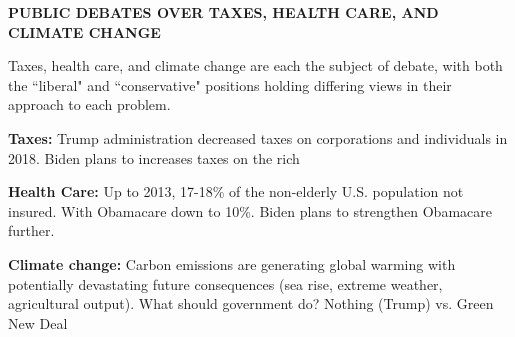 \documentclass[landscape]{slides}
\begin{document}
\begin{slide}
\begin{center}
{\bf PUBLIC DEBATES OVER TAXES, HEALTH CARE, AND CLIMATE CHANGE}
\end{center}

Taxes, health care, and climate change are each the subject of debate, with both the ``liberal" and ``conservative" positions holding differing views in their approach to each problem.

{\bf Taxes:} Trump administration decreased taxes on corporations and individuals in 2018. 
Biden plans to increases taxes on the rich

%

{\bf Health Care:}
Up to 2013, 17-18\% of the non-elderly U.S. population not insured.
With Obamacare down to 10\%. Biden plans to strengthen Obamacare further.



{\bf Climate change:} Carbon emissions are generating global warming with potentially 
devastating future consequences (sea rise, extreme weather, agricultural output).
What should government do? Nothing (Trump) vs. Green New Deal 

\end{slide}

%

\begin{slide}

\end{slide}

\begin{slide}

\end{slide}

%
%
%
\end{document}
